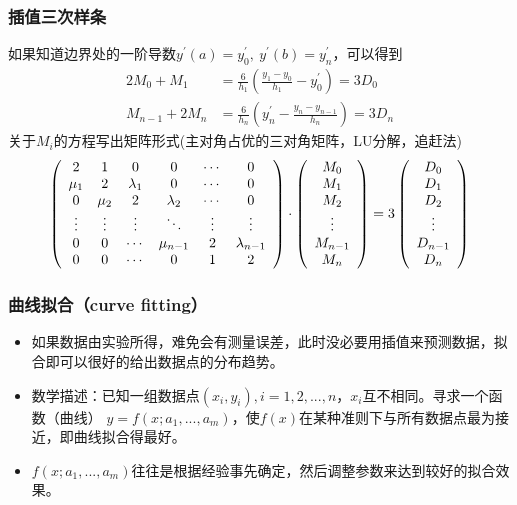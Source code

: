 \documentclass[red,compress]{beamer}
\begin{document}
\begin{frame}
\frametitle{插值三次样条}
如果知道边界处的一阶导数$y^{'}(a)=y^{'}_0,\: y^{'}(b)=y^{'}_n$，可以得到
\begin{align*}
	2M_0+M_1 &= \frac{6}{h_1}(\frac{y_1-y_0}{h_1}-y_0^{'})=3D_0 \\
	M_{n-1}+2M_n&=\frac{6}{h_n}(y_n^{'}-\frac{y_n-y_{n-1}}{h_n})=3D_n 
\end{align*}
关于$M_i$的方程写出矩阵形式(主对角占优的三对角矩阵，LU分解，追赶法)
\begin{equation*}
\left(
\begin{array}{*{6}c}
2 & 1 & 0 & 0 & \cdots & 0 \\
\mu_1 & 2 & \lambda_1 & 0 & \cdots & 0 \\
0 & \mu_2 & 2 & \lambda_2 & \cdots & 0 \\
\vdots & \vdots & \vdots & \ddots & \vdots & \vdots \\
0 & 0 & \cdots & \mu_{n-1} & 2 & \lambda_{n-1} \\
0 & 0 & \cdots & 0 & 1 & 2
\end{array}
\right)
\cdot
\left(
\begin{array}{c}
M_0 \\
M_1 \\
M_2 \\
\vdots \\
M_{n-1} \\
M_{n}
\end{array}
\right)
=3\left(
\begin{array}{c}
D_0 \\
D_1 \\
D_2 \\
\vdots \\
D_{n-1} \\
D_{n}
\end{array}
\right)
\end{equation*}
\end{frame}


\begin{frame}
\frametitle{曲线拟合（curve fitting）}
\begin{itemize}
\item
如果数据由实验所得，难免会有测量误差，此时没必要用插值来预测数据，拟合即可以很好的给出数据点的分布趋势。

\item 
数学描述：已知一组数据点$(x_i,y_i),i=1,2,...,n$，$x_i$互不相同。寻求一个函数（曲线） $y = f (x;a_1,...,a_m)$，使$f(x)$在某种准则下与所有数据点最为接近，即曲线拟合得最好。

\item
$f(x;a_1,...,a_m)$往往是根据经验事先确定，然后调整参数来达到较好的拟合效果。

\end{itemize}

\end{frame}
\end{document}
